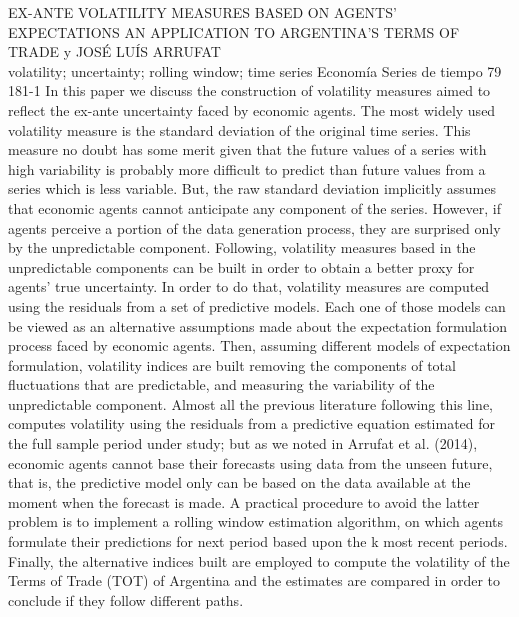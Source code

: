 \A
{EX-ANTE VOLATILITY MEASURES BASED ON AGENTS’ EXPECTATIONS AN APPLICATION TO ARGENTINA’S TERMS OF TRADE}
{ y JOSÉ LUÍS ARRUFAT}
{
\\}
{volatility; uncertainty; rolling window; time series} 
 {Economía} 
 {Series de tiempo} 
 {79} 
 {181-1}
{In this paper we discuss the construction of volatility measures aimed to reflect the ex-ante uncertainty faced by economic agents. The most widely used volatility measure is the standard deviation of the original time series. This measure no doubt has some merit given that the future values of a series with high variability is probably more difficult to predict than future values from a series which is less variable. But, the raw standard deviation implicitly assumes that economic agents cannot anticipate any component of the series. However, if agents perceive a portion of the data generation process, they are surprised only by the unpredictable component. Following, volatility measures based in the unpredictable components can be built in order to obtain a better proxy for agents’ true uncertainty. In order to do that, volatility measures are computed using the residuals from a set of predictive models. Each one of those models can be viewed as an alternative assumptions made about the expectation formulation process faced by economic agents. Then, assuming different models of expectation formulation, volatility indices are built removing the components of total fluctuations that are predictable, and measuring the variability of the unpredictable component. Almost all the previous literature following this line, computes volatility using the residuals from a predictive equation estimated for the full sample period under study; but as we noted in Arrufat et al. (2014), economic agents cannot base their forecasts using data from the unseen future, that is, the predictive model only can be based on the data available at the moment when the forecast is made. A practical procedure to avoid the latter problem is to implement a rolling window estimation algorithm, on which agents formulate their predictions for next period based upon the k most recent periods. Finally, the alternative indices built are employed to compute the volatility of the Terms of Trade (TOT) of Argentina and the estimates are compared in order to conclude if they follow different paths.}
